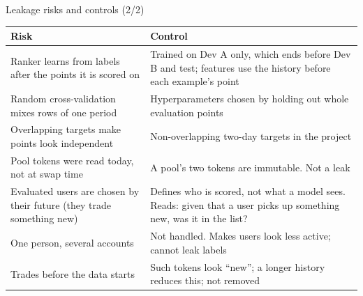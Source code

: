 \documentclass[aspectratio=169,10pt]{beamer}
\newcommand{\toindex}{\hfill\hyperlink{index}{\beamerreturnbutton{index}}}
\begin{document}
\begin{frame}{Leakage risks and controls (2/2) \toindex}
  \scriptsize
  \renewcommand{\arraystretch}{1.2}
  \begin{tabularx}{\textwidth}{@{}>{\raggedright\arraybackslash}p{6.0cm}>{\raggedright\arraybackslash}X@{}}
    \toprule
    Risk & Control \\
    \midrule
    Ranker learns from labels after the points it is scored on & Trained on Dev A only, which ends before Dev B and test; features use the history before each example's point \\
    Random cross-validation mixes rows of one period & Hyperparameters chosen by holding out whole evaluation points \\
    Overlapping targets make points look independent & Non-overlapping two-day targets in the project \\
    Pool tokens were read today, not at swap time & A pool's two tokens are immutable. Not a leak \\
    Evaluated users are chosen by their future (they trade something new) & Defines who is scored, not what a model sees. Reads: given that a user picks up something new, was it in the list? \\
    One person, several accounts & Not handled. Makes users look less active; cannot leak labels \\
    Trades before the data starts & Such tokens look ``new''; a longer history reduces this; not removed \\
    \bottomrule
  \end{tabularx}
\end{frame}
\end{document}
